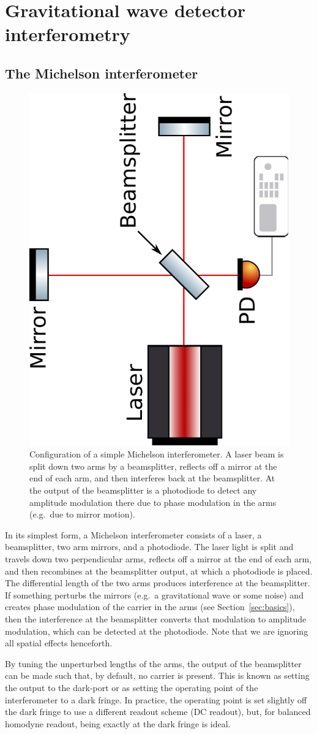 \documentclass[aps,pra,superscriptaddress,reprint,nofootinbib]{revtex4-1}
\begin{document}
\section{Gravitational wave detector interferometry}
\label{sec:gwIFO}

\subsection{The Michelson interferometer}

\begin{figure}[ht]
	\begin{center}
	\includegraphics[height=0.35\textwidth, angle=-90]{figures/Michelson_interferometer.pdf}
	\end{center}
	\caption{Configuration of a simple Michelson interferometer. A laser beam is split down two arms by a beamsplitter, reflects off a mirror at the end of each arm, and then interferes back at the beamsplitter. At the output of the beamsplitter is a photodiode to detect any amplitude modulation there due to phase modulation in the arms (e.g.\ due to mirror motion).}
	\label{fig:Michelson}
\end{figure}

In its simplest form, a Michelson interferometer consists of a laser, a beamsplitter, two arm mirrors, and a photodiode. The laser light is split and travels down two perpendicular arms, reflects off a mirror at the end of each arm, and then recombines at the beamsplitter output, at which a photodiode is placed. The differential length of the two arms produces interference at the beamsplitter.
If something perturbs the mirrors (e.g.\ a gravitational wave or some noise) and creates phase modulation of the carrier in the arms (see Section~\ref{sec:basics}), then the interference at the beamsplitter converts that modulation to amplitude modulation, which can be detected at the photodiode.
Note that we are ignoring all spatial effects henceforth.


By tuning the unperturbed lengths of the arms, the output of the beamsplitter can be made such that, by default, no carrier is present. This is known as setting the output to the dark-port or as setting the operating point of the interferometer to a dark fringe. In practice, the operating point is set slightly off the dark fringe to use a different readout scheme (DC readout), but, for balanced homodyne readout, being exactly at the dark fringe is ideal.
\end{document}
